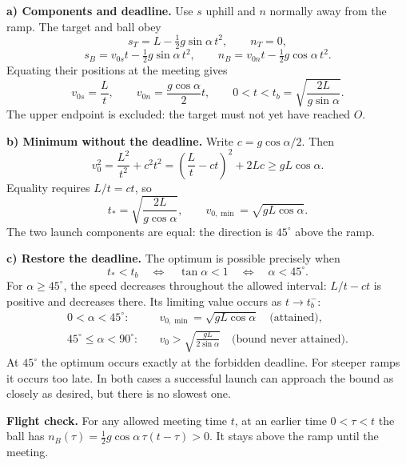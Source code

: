 \documentclass[11pt,a4paper]{article}
\begin{document}
\textbf{a) Components and deadline.} Use $s$ uphill and $n$ normally away from the ramp. The target and ball obey
\[
s_T=L-\tfrac12g\sin\alpha\,t^2,\qquad n_T=0,
\]
\[
s_B=v_{0s}t-\tfrac12g\sin\alpha\,t^2,\qquad
n_B=v_{0n}t-\tfrac12g\cos\alpha\,t^2.
\]
Equating their positions at the meeting gives
\[
\boxed{v_{0s}=\frac Lt,\qquad v_{0n}=\frac{g\cos\alpha}{2}t,
\qquad 0<t<t_b=\sqrt{\frac{2L}{g\sin\alpha}}.}
\]
The upper endpoint is excluded: the target must not yet have reached $O$.

\textbf{b) Minimum without the deadline.} Write $c=g\cos\alpha/2$. Then
\[
v_0^2=\frac{L^2}{t^2}+c^2t^2
=\left(\frac Lt-ct\right)^2+2Lc\ge gL\cos\alpha.
\]
Equality requires $L/t=ct$, so
\[
\boxed{t_*=\sqrt{\frac{2L}{g\cos\alpha}},\qquad
v_{0,\min}=\sqrt{gL\cos\alpha}.}
\]
The two launch components are equal: the direction is $45^\circ$ above the ramp.

\textbf{c) Restore the deadline.} The optimum is possible precisely when
\[
t_*<t_b\quad\Longleftrightarrow\quad\tan\alpha<1
\quad\Longleftrightarrow\quad\alpha<45^\circ.
\]
For $\alpha\ge45^\circ$, the speed decreases throughout the allowed interval: $L/t-ct$ is positive and decreases there. Its limiting value occurs as $t\to t_b^-$:
\[
\boxed{\begin{aligned}
0<\alpha<45^\circ:&\quad v_{0,\min}=\sqrt{gL\cos\alpha}\quad\text{(attained)},\\[3pt]
45^\circ\le\alpha<90^\circ:&\quad v_0>\sqrt{\frac{gL}{2\sin\alpha}}\quad\text{(bound never attained)}.
\end{aligned}}
\]
At $45^\circ$ the optimum occurs exactly at the forbidden deadline. For steeper ramps it occurs too late. In both cases a successful launch can approach the bound as closely as desired, but there is no slowest one.

{\small\textbf{Flight check.} For any allowed meeting time $t$, at an earlier time $0<\tau<t$ the ball has
$n_B(\tau)=\tfrac12g\cos\alpha\,\tau(t-\tau)>0$.
It stays above the ramp until the meeting.}
\end{document}
